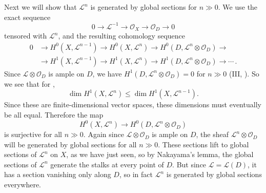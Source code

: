 {Next we will show that $\mathcal L^n$ is generated by global sections for $n\gg0$. We use the exact sequence
\[
0\to\mathcal L^{-1}\to\mathcal O_X\to\mathcal O_D\to0
\]
tensored with $\mathcal L^n$, and the resulting cohomology sequence
\[
\begin{aligned}
0&\to H^0(X,\mathcal L^{n-1})\to H^0(X,\mathcal L^n)\to H^0(D,\mathcal L^n\otimes\mathcal O_D)\to\\
&\to H^1(X,\mathcal L^{n-1})\to H^1(X,\mathcal L^n)\to H^1(D,\mathcal L^n\otimes\mathcal O_D)\to\cdots\,.
\end{aligned}
\]
Since $\mathcal L\otimes\mathcal O_D$ is ample on $D$, we have $H^1(D,\mathcal L^n\otimes\mathcal O_D)=0$ for $n\gg0$ (III, ). So we see that for ,
\[
\dim H^1(X,\mathcal L^n)\leq\dim H^1(X,\mathcal L^{n-1}).
\]
Since these are finite-dimensional vector spaces, these dimensions must eventually be all equal. Therefore the map
\[
H^0(X,\mathcal L^n)\to H^0(D,\mathcal L^n\otimes\mathcal O_D)
\]
is surjective for all $n\gg0$. Again since $\mathcal L\otimes\mathcal O_D$ is ample on $D$, the sheaf $\mathcal L^n\otimes\mathcal O_D$ will be generated by global sections for all $n\gg0$. These sections lift to global sections of $\mathcal L^n$ on $X$, as we have just seen, so by Nakayama's lemma, the global sections of $\mathcal L^n$ generate the stalks at every point of $D$. But since $\mathcal L=\mathcal L(D)$, it has a section vanishing only along $D$, so in fact $\mathcal L^n$ is generated by global sections everywhere.
}
